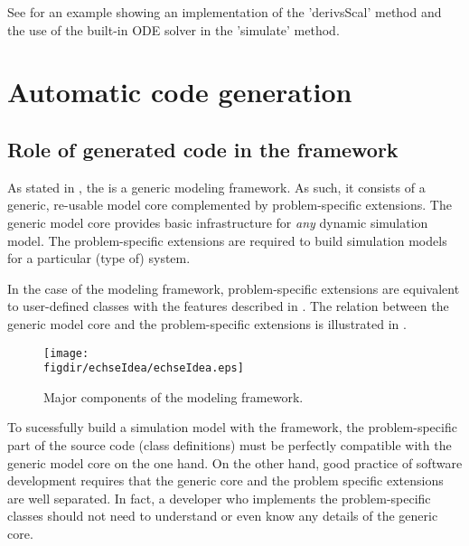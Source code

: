 See  for an example showing an implementation of the 'derivsScal' method and the use of the built-in ODE solver in the 'simulate' method.


\FloatBarrier

\section{Automatic code generation} \label{sec:concept-autocode}

\subsection{Role of generated code in the  framework} \label{sec:concept-autocode-role}
As stated in , the  is a generic modeling framework. As such, it consists of a generic, re-usable model core complemented by problem-specific extensions. The generic model core provides basic infrastructure for \emph{any} dynamic simulation model. The problem-specific extensions are required to build simulation models for a particular (type of) system.

In the case of the  modeling framework, problem-specific extensions are equivalent to user-defined classes with the features described in . The relation between the generic model core and the problem-specific extensions is illustrated in .

\begin{figure}
  \texttt{[image: \\figdir/echseIdea/echseIdea.eps]}
  \caption{Major components of the  modeling framework. \label{fig:concept-autocode-role}}
\end{figure}

To sucessfully build a simulation model with the  framework, the problem-specific part of the source code (class definitions) must be perfectly compatible with the generic model core on the one hand. On the other hand, good practice of software development requires that the generic core and the problem specific extensions are well separated. In fact, a developer who implements the problem-specific classes should not need to understand or even know any details of the generic core.

